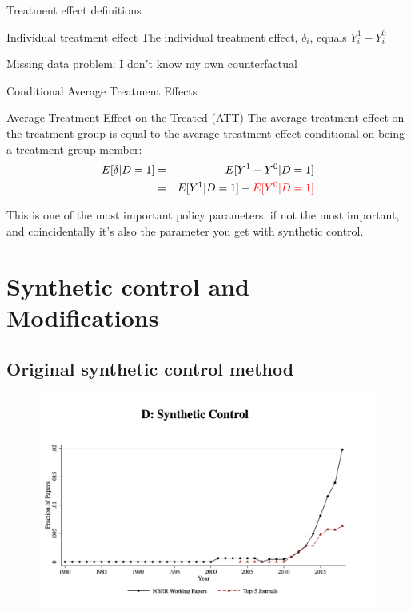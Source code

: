 \documentclass{beamer}
\begin{document}
\begin{frame}{Treatment effect definitions}


	\begin{block}{Individual treatment effect}
	    The individual treatment effect,  $\delta_i$, equals $Y_i^1-Y_i^0$
	\end{block}

Missing data problem:  I don't know my own counterfactual
	
\end{frame}


\begin{frame}{Conditional Average Treatment Effects}	
	\begin{block}{Average Treatment Effect on the Treated (ATT)}
	The average treatment effect on the treatment group is equal to the average treatment effect conditional on being a treatment group member:
		\begin{eqnarray*}
		E[\delta|D=1]&=&E[Y^1-Y^0|D=1] \nonumber \\
		&=&E[Y^1|D=1]-\textcolor{red}{E[Y^0|D=1]}
		\end{eqnarray*}
	\end{block}
	
	\bigskip

This is one of the most important policy parameters, if not the most important, and coincidentally it's also the parameter you get with synthetic control.  

	
\end{frame}




\section{Synthetic control and Modifications}

\subsection{Original synthetic control method}


\begin{frame}[plain]
	\begin{figure}
	\includegraphics[scale=0.25]{./lecture_includes/currie_synth.png}
	\end{figure}
\end{frame}
\end{document}
